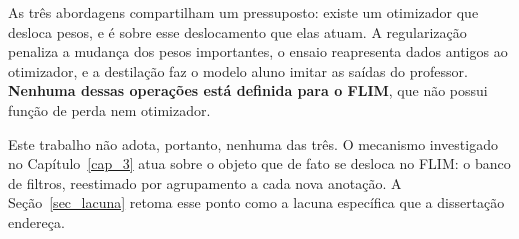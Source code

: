 As três abordagens compartilham um pressuposto: existe um otimizador que desloca pesos, e é sobre esse deslocamento que elas atuam. A regularização penaliza a mudança dos pesos importantes, o ensaio reapresenta dados antigos ao otimizador, e a destilação faz o modelo aluno imitar as saídas do professor. \textbf{Nenhuma dessas operações está definida para o \ac{FLIM}}, que não possui função de perda nem otimizador.

Este trabalho não adota, portanto, nenhuma das três. O mecanismo investigado no Capítulo~\ref{cap_3} atua sobre o objeto que de fato se desloca no \ac{FLIM}: o banco de filtros, reestimado por agrupamento a cada nova anotação. A Seção~\ref{sec_lacuna} retoma esse ponto como a lacuna específica que a dissertação endereça.





